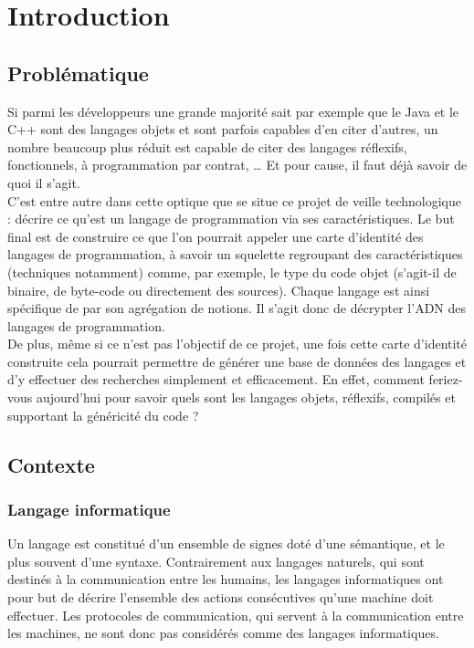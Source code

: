 \section{Introduction}

\subsection{Problématique}
Si parmi les développeurs une grande majorité sait par exemple que le Java et le C++ sont des langages objets et sont parfois capables d'en citer d'autres, un nombre beaucoup plus réduit est capable de citer des langages réflexifs, fonctionnels, à programmation par contrat, …
Et pour cause, il faut déjà savoir de quoi il s'agit.\\

C'est entre autre dans cette optique que se situe ce projet de veille technologique : décrire ce qu'est un langage de programmation via ses caractéristiques.
Le but final est de construire ce que l'on pourrait appeler une carte d'identité des langages de programmation, à savoir un squelette regroupant des caractéristiques (techniques notamment) comme, par exemple, le type du code objet (s'agit-il de binaire, de byte-code ou directement des sources).
Chaque langage est ainsi spécifique de par son agrégation de notions. Il s'agit donc de décrypter l'ADN des langages de programmation.\\

De plus, même si ce n'est pas l'objectif de ce projet, une fois cette carte d'identité construite cela pourrait permettre de générer une base de données des langages et d'y effectuer des recherches simplement et efficacement.
En effet, comment feriez-vous aujourd'hui pour savoir quels sont les langages objets, réflexifs, compilés et supportant la généricité du code ?

\subsection{Contexte}

\subsubsection{Langage informatique}

Un langage est constitué d’un ensemble de signes doté d’une sémantique, et le plus souvent d’une syntaxe. Contrairement aux langages naturels, qui sont destinés à la communication entre les humains, les langages informatiques ont pour but de décrire l’ensemble des actions consécutives qu’une machine doit effectuer. Les protocoles de communication, qui servent à la communication entre les machines, ne sont donc pas considérés comme des langages informatiques.\\

